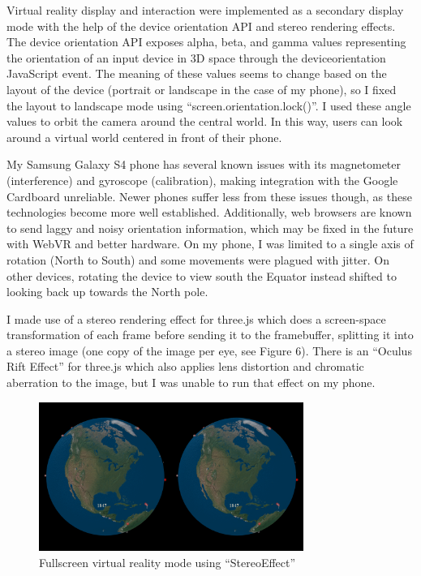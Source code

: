\documentclass[conference]{acmsiggraph}
\begin{document}
Virtual reality display and interaction were implemented as a secondary display
mode with the help of the device orientation API and stereo rendering effects.
The device orientation API exposes alpha, beta, and gamma values representing
the orientation of an input device in 3D space through the deviceorientation
JavaScript event. The meaning of these values seems to change based on the
layout of the device (portrait or landscape in the case of my phone), so I fixed
the layout to landscape mode using ``screen.orientation.lock()''. I used these
angle values to orbit the camera around the central world. In this way, users
can look around a virtual world centered in front of their phone.

My Samsung Galaxy S4 phone has several known issues with its magnetometer
(interference) and gyroscope (calibration), making integration with the Google
Cardboard unreliable. Newer phones suffer less from these issues though, as
these technologies become more well established. Additionally, web browsers are
known to send laggy and noisy orientation information, which may be fixed in the
future with WebVR and better hardware. On my phone, I was limited to a single
axis of rotation (North to South) and some movements were plagued with jitter.
On other devices, rotating the device to view south the Equator instead shifted
to looking back up towards the North pole.

I made use of a stereo rendering effect for three.js which does a screen-space
transformation of each frame before sending it to the framebuffer, splitting it
into a stereo image (one copy of the image per eye, see Figure 6). There is an
``Oculus Rift Effect'' for three.js which also applies lens distortion and
chromatic aberration to the image, but I was unable to run that effect on my
phone.

\begin{figure}
  \centering
  \includegraphics[width=3.4in]{images/vr}
  \caption{Fullscreen virtual reality mode using ``StereoEffect''}
\end{figure}
\end{document}
